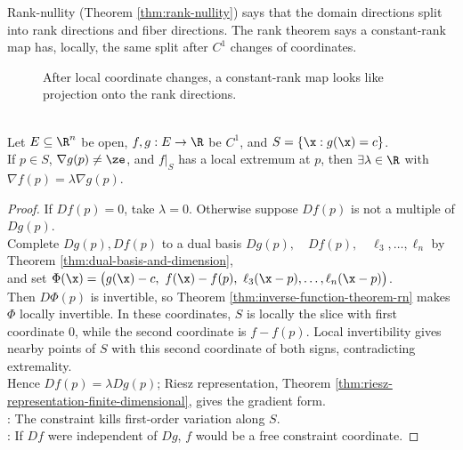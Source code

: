 Rank-nullity (Theorem \ref{thm:rank-nullity}) says that the domain directions split into rank directions and fiber directions. The rank theorem says a constant-rank map has, locally, the same split after $C^1$ changes of coordinates.

\begin{figure}[H]
  \centering
  
  \caption{After local coordinate changes, a constant-rank map looks like projection onto the rank directions.}
  \label{fig:rank-theorem-projection-normal-form}
\end{figure}

\begin{theorem} \label{thm:lagrange-multiplier-one-constraint} \\
Let $E\subseteq\R^n$ be open, $f,g:E\to\R$ be $C^1$, and $S=\{\x:g(\x)=c\}$.\\
If $p\in S$, $\nabla g(p)\neq\ze$, and $f|_S$ has a local extremum at $p$, then $\exists\lambda\in\R$ with $\nabla f(p)=\lambda\nabla g(p)$.
\begin{proof}
If $Df(p)=0$, take $\lambda=0$. Otherwise suppose $Df(p)$ is not a multiple of $Dg(p)$.\\
Complete $Dg(p),Df(p)$ to a dual basis $Dg(p),\quad Df(p),\quad \ell_3,\ldots,\ell_n$ by Theorem \ref{thm:dual-basis-and-dimension},\\
and set $\Phi(\x)=\bigl(g(\x)-c,\ f(\x)-f(p),\ \ell_3(\x-p),\ldots,\ell_n(\x-p)\bigr)$.\\
Then $D\Phi(p)$ is invertible, so Theorem \ref{thm:inverse-function-theorem-rn} makes $\Phi$ locally invertible. In these coordinates, $S$ is locally the slice with first coordinate $0$, while the second coordinate is $f-f(p)$. Local invertibility gives nearby points of $S$ with this second coordinate of both signs, contradicting extremality.\\
Hence $Df(p)=\lambda Dg(p)$; Riesz representation, Theorem \ref{thm:riesz-representation-finite-dimensional}, gives the gradient form.\\
: The constraint kills first-order variation along $S$.\\
: If $Df$ were independent of $Dg$, $f$ would be a free constraint coordinate.
\end{proof}
\end{theorem}

